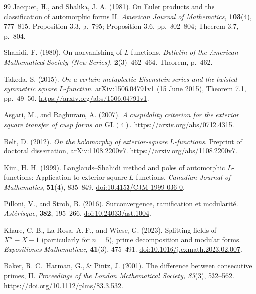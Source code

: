 \documentclass[11pt]{article}
\theoremstyle{definition}
\theoremstyle{remark}
\newcommand{\GL}{\mathrm{GL}}
\numberwithin{equation}{section}
\begin{document}
\begin{thebibliography}{99}
Jacquet, H., and Shalika, J. A. (1981).
On Euler products and the classification of automorphic forms II.
\emph{American Journal of Mathematics}, \textbf{103}(4), 777--815.
Proposition 3.3, p.~795; Proposition 3.6, pp.~802--804; Theorem 3.7, p.~804.

Shahidi, F. (1980). On nonvanishing of $L$-functions.
\emph{Bulletin of the American Mathematical Society (New Series)}, \textbf{2}(3), 462--464.
Theorem, p.~462.

Takeda, S. (2015).
\emph{On a certain metaplectic Eisenstein series and the twisted symmetric square $L$-function}.
arXiv:1506.04791v1 (15 June 2015), Theorem 7.1, pp.~49--50.
\url{https://arxiv.org/abs/1506.04791v1}.

Asgari, M., and Raghuram, A. (2007).
\emph{A cuspidality criterion for the exterior square transfer of cusp forms on $\GL(4)$}.
\url{https://arxiv.org/abs/0712.4315}.

Belt, D. (2012). \emph{On the holomorphy of exterior-square $L$-functions}.
Preprint of doctoral dissertation, arXiv:1108.2200v7.
\url{https://arxiv.org/abs/1108.2200v7}.

Kim, H. H. (1999). Langlands--Shahidi method and poles of automorphic $L$-functions: Application to exterior square $L$-functions.
\emph{Canadian Journal of Mathematics}, \textbf{51}(4), 835--849.
\href{https://doi.org/10.4153/CJM-1999-036-0}{doi:10.4153/CJM-1999-036-0}.

Pilloni, V., and Stroh, B. (2016).
Surconvergence, ramification et modularit\'e.
\emph{Ast\'erisque}, \textbf{382}, 195--266.
\href{https://doi.org/10.24033/ast.1004}{doi:10.24033/ast.1004}.

Khare, C. B., La Rosa, A. F., and Wiese, G. (2023).
Splitting fields of $X^n-X-1$ (particularly for $n=5$), prime decomposition and modular forms.
\emph{Expositiones Mathematicae}, \textbf{41}(3), 475--491.
\href{https://doi.org/10.1016/j.exmath.2023.02.007}{doi:10.1016/j.exmath.2023.02.007}.

Baker, R. C., Harman, G., \& Pintz, J. (2001). The difference between consecutive primes, II.
\emph{Proceedings of the London Mathematical Society, 83}(3), 532--562.
\url{https://doi.org/10.1112/plms/83.3.532}.


\end{thebibliography}
\end{document}
